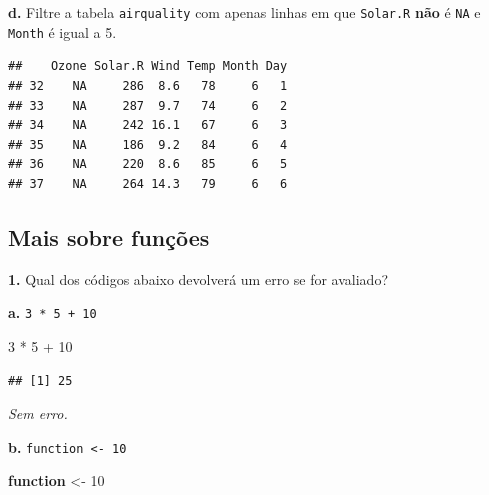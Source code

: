 \documentclass[
]{book}
\newenvironment{Shaded}{\begin{snugshade}}{\end{snugshade}}
\newcommand{\CommentTok}[1]{\textcolor[rgb]{0.56,0.35,0.01}{\textit{#1}}}
\newcommand{\ControlFlowTok}[1]{\textcolor[rgb]{0.13,0.29,0.53}{\textbf{#1}}}
\newcommand{\DecValTok}[1]{\textcolor[rgb]{0.00,0.00,0.81}{#1}}
\newcommand{\FunctionTok}[1]{\textcolor[rgb]{0.00,0.00,0.00}{#1}}
\newcommand{\NormalTok}[1]{#1}
\newcommand{\OtherTok}[1]{\textcolor[rgb]{0.56,0.35,0.01}{#1}}
\newcommand{\SpecialCharTok}[1]{\textcolor[rgb]{0.00,0.00,0.00}{#1}}
\begin{document}
\textbf{d.} Filtre a tabela \texttt{airquality} com apenas linhas em que \texttt{Solar.R} \textbf{não} é \texttt{NA} e \texttt{Month} é igual a 5.

\begin{Shaded}
\end{Shaded}

\begin{verbatim}
##    Ozone Solar.R Wind Temp Month Day
## 32    NA     286  8.6   78     6   1
## 33    NA     287  9.7   74     6   2
## 34    NA     242 16.1   67     6   3
## 35    NA     186  9.2   84     6   4
## 36    NA     220  8.6   85     6   5
## 37    NA     264 14.3   79     6   6
\end{verbatim}

\hypertarget{mais-sobre-funuxe7uxf5es}{%
\subsection*{Mais sobre funções}\label{mais-sobre-funuxe7uxf5es}}

\textbf{1.} Qual dos códigos abaixo devolverá um erro se for avaliado?

\textbf{a.} \texttt{3\ *\ 5\ +\ 10}

\begin{Shaded}
\begin{Highlighting}[]
\DecValTok{3} \SpecialCharTok{*} \DecValTok{5} \SpecialCharTok{+} \DecValTok{10}
\end{Highlighting}
\end{Shaded}

\begin{verbatim}
## [1] 25
\end{verbatim}

\emph{Sem erro.}

\textbf{b.} \texttt{function\ \textless{}-\ 10}

\begin{Shaded}
\begin{Highlighting}[]
\ControlFlowTok{function} \OtherTok{\textless{}{-}} \DecValTok{10}
\end{Highlighting}
\end{Shaded}
\end{document}
